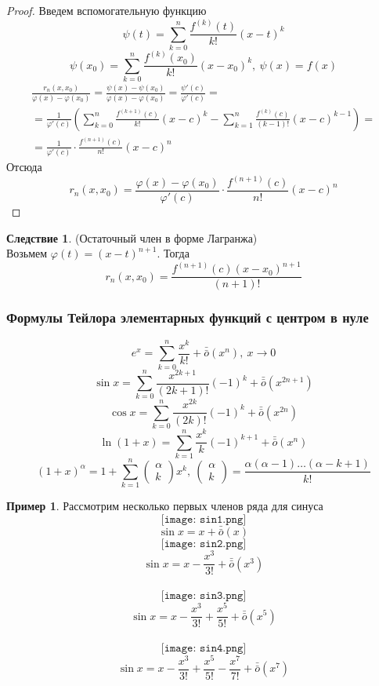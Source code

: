\documentclass[a4paper, 12pt]{article}
\renewcommand{\phi}{\varphi}
\theoremstyle{definition}
\newtheorem*{consequense}{Следствие}
\newtheorem*{example}{Пример}
\begin{document}
        \begin{proof}
            Введем вспомогательную функцию
            \[\psi(t)=\sum\limits_{k=0}^{n}\frac{f^{(k)}(t)}{k!}(x-t)^k\]
            \[\psi(x_0)=\sum\limits_{k=0}^{n}\frac{f^{(k)}(x_0)}{k!}(x-x_0)^k,\ \psi(x)=f(x)\]
            \begin{multline*}
                \frac{r_n(x,x_0)}{\phi(x)-\phi(x_0)}=\frac{\psi(x)-\psi(x_0)}{\phi(x)-\phi(x_0)}=\frac{\psi'(c)}{\phi'(c)}=\\
                =\frac{1}{\phi'(c)}(\sum\limits_{k=0}^{n}\frac{f^{(k+1)}(c)}{k!}(x-c)^k-\sum\limits_{k=1}^{n}\frac{f^{(k)}(c)}{(k-1)!}(x-c)^{k-1})=\\
                =\frac{1}{\phi'(c)}\cdot \frac{f^{(n+1)}(c)}{n!}(x-c)^n
            \end{multline*}
            Отсюда
            \[r_n(x,x_0)=\frac{\phi(x)-\phi(x_0)}{\phi'(c)}\cdot \frac{f^{(n+1)}(c)}{n!}(x-c)^n\]
        \end{proof} 
        \begin{consequense} (Остаточный член в форме Лагранжа)\\
           Возьмем $\phi(t)=(x-t)^{n+1}$. Тогда
           \[r_n(x,x_0)=\frac{f^{(n+1)}(c)(x-x_0)^{n+1}}{(n+1)!}\]
        \end{consequense}
        \subsubsection*{Формулы Тейлора элементарных функций с центром в нуле}
            \[e^x=\sum\limits_{k=0}^{n}\frac{x^k}{k!}+\bar{\bar{o}}{(x^n)},\ x\to 0\]
            \[\sin{x}=\sum\limits_{k=0}^{n}\frac{x^{2k+1}}{(2k+1)!}(-1)^k+\bar{\bar{o}}{(x^{2n+1})}\]
            \[\cos{x}= \sum\limits_{k=0}^{n}\frac{x^{2k}}{(2k)!}(-1)^{k}+\bar{\bar{o}}{(x^{2n})}\]
            \[\ln{(1+x)}=\sum\limits_{k=1}^{n}\frac{x^k}{k}(-1)^{k+1}+\bar{\bar{o}}{(x^n)}\]
            \[(1+x)^{\alpha}=1+\sum\limits_{k=1}^{n}
            \begin{pmatrix}
                \alpha\\
                k
            \end{pmatrix}
            x^k,\ 
            \begin{pmatrix}
                \alpha\\
                k
            \end{pmatrix}
            =\frac{\alpha(\alpha-1)\dots(\alpha-k+1)}{k!}
            \]
        
            \begin{example}
            Рассмотрим несколько первых членов ряда для синуса
            \[\texttt{[image: sin1.png]}\]
            \[\sin{x}=x+\bar{\bar{o}}{(x)}\]
            \[\texttt{[image: sin2.png]}\]
            \[\sin{x}=x-\frac{x^3}{3!}+\bar{\bar{o}}{(x^3)}\]\\
            \[\texttt{[image: sin3.png]}\]
            \[\sin{x}=x-\frac{x^3}{3!}+\frac{x^5}{5!}+\bar{\bar{o}}{(x^5)}\]\\
            \[\texttt{[image: sin4.png]}\]
            \[\sin{x}=x-\frac{x^3}{3!}+\frac{x^5}{5!}-\frac{x^7}{7!}+\bar{\bar{o}}{(x^7)}\]
        \end{example}
\end{document}
